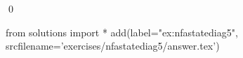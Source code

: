 
\begin{ex} 
  \label{ex:nfastatediag5}
  
  \qed
\end{ex} 
\begin{python0}
from solutions import *
add(label="ex:nfastatediag5",
    srcfilename='exercises/nfastatediag5/answer.tex') 
\end{python0}
